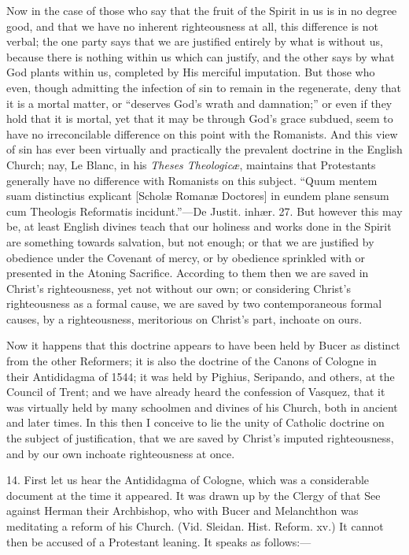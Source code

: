 Now in the case of those who say that the fruit of the Spirit in us
is in no degree good, and that we have no inherent righteousness at
all, this difference is not verbal; the one party says that we are
justified entirely by what is without us, because there is nothing
within us which can justify, and the other says by what God plants
within us, completed by His merciful imputation. But those who even,
though admitting the infection of sin to remain in the regenerate,
deny that it is a mortal matter, or ``deserves God's wrath and
damnation;'' or even if they hold that it is mortal, yet that it
may be through God's grace subdued, seem to have no irreconcilable
difference on this point with the Romanists. And this view of sin has
ever been virtually and practically the prevalent doctrine in the
English Church; nay, Le Blanc, in his \emph{Theses Theologicæ},
maintains that Protestants generally have no difference with Romanists
on this subject. ``Quum mentem suam distinctius explicant [Scholæ
Romanæ Doctores] in eundem plane sensum cum Theologis Reformatis
incidunt.''—De Justit. inhær. 27. But however this may be, at
least English divines teach that our holiness and works done in the
Spirit are something towards salvation, but not enough; or that we are
justified by obedience under the Covenant of mercy, or by obedience
sprinkled with or presented in the Atoning Sacrifice. According to
them then we are saved in Christ's righteousness, yet not without our
own; or considering Christ's righteousness as a formal cause, we are
saved by two contemporaneous formal causes, by a righteousness,
meritorious on Christ's part, inchoate on ours.

Now it happens that this doctrine appears to have been held by
Bucer as distinct from the other Reformers; it is also the
doctrine of the Canons of Cologne in their Antididagma of 1544; it was
held by Pighius, Seripando, and others, at the Council of Trent; and
we have already heard the confession of Vasquez, that it was virtually
held by many schoolmen and divines of his Church, both in ancient and
later times. In this then I conceive to lie the unity of Catholic
doctrine on the subject of justification, that we are saved by
Christ's imputed righteousness, and by our own inchoate righteousness
at once.

14. First let us hear the Antididagma of Cologne, which was a
considerable document at the time it appeared. It was drawn up by the
Clergy of that See against Herman their Archbishop, who with Bucer and
Melanchthon was meditating a reform of his Church. (Vid. Sleidan. Hist.
Reform. xv.) It cannot then be accused of a Protestant leaning. It
speaks as follows:—

